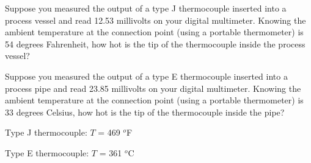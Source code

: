 

Suppose you measured the output of a type J thermocouple inserted into a process vessel and read 12.53 millivolts on your digital multimeter.  Knowing the ambient temperature at the connection point (using a portable thermometer) is 54 degrees Fahrenheit, how hot is the tip of the thermocouple inside the process vessel?

\vskip 10pt

Suppose you measured the output of a type E thermocouple inserted into a process pipe and read 23.85 millivolts on your digital multimeter.  Knowing the ambient temperature at the connection point (using a portable thermometer) is 33 degrees Celsius, how hot is the tip of the thermocouple inside the pipe?







Type J thermocouple: $T$ = 469 $^{o}$F

\vskip 10pt

Type E thermocouple: $T$ = 361 $^{o}$C










